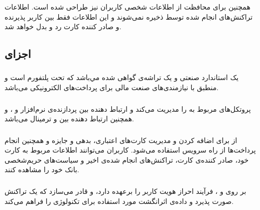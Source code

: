 \documentclass[oneside]{report}
\begin{document}
{\normalsize {}}
همچنین برای محافظت از اطلاعات شخصی کاربران نیز طراحی شده است. اطلاعات تراکنش‌های انجام شده توسط 
{\normalsize {}}
ذخیره نمی‌شوند و این اطلاعات فقط بین کاربر پذیرنده و صادر کننده کارت رد‌‌ و بدل خواهد شد.

\subsection{اجزای {\normalsize {}} }
 
 \subsubsection{{\small {}}}
 {\normalsize {}}
 یک استاندارد صنعتی و یک تراشه‌ی گواهی شده
 مي‌باشد که تحت پلتفورم 
 {\normalsize {}}
 است و منطبق با نیازمندی‌های صنعت مالی برای پرداخت‌های الکترونیکی می‌باشد.
 
  \subsubsection{{\small {}}}
  {\normalsize {}}
  پروتکل‌های مربوط به 
   {\normalsize {}}
   را مدیریت می‌کند و ارتباط دهنده بین پردازنده‌ی نرم‌افزار 
  و 
   {\normalsize {}}،   و همچنین ارتباط دهنده بین 
    {\normalsize {}}
    و ترمینال
     {\normalsize {}} 
      می‌باشد.
      
        \subsubsection{{\small {}}}
        از
           {\normalsize {}}
           برای اضافه کردن و مدیریت کارت‌های اعتباری، بدهی و جایزه و همچنین انجام پرداخت‌ها از راه سرویس 
              {\normalsize {}}
              استفاده می‌شود.
              کاربران می‌توانند اطلاعات مربوط به کارت خود،  صادر کننده‌ی کارت،   تراکنش‌های انجام شده‌ی اخیر و سیاست‌های حریم‌شخصی 
              بانک خود را مشاهده کنند.
 
         \subsubsection{{\small {}}}
                       {\normalsize {}}
    بر روی
               {\normalsize {}} و
                          {\normalsize {}}،
                                     {\normalsize {}}
    فرآیند احراز هویت کاربر را برعهده دارد،  و قادر می‌سازد که یک تراکنش صورت پذیرد و داده‌ی اثرانگشت مورد استفاده برای تکنولوژی 
               {\normalsize {}}
               را فراهم می‌کند. 
               
\end{document}
